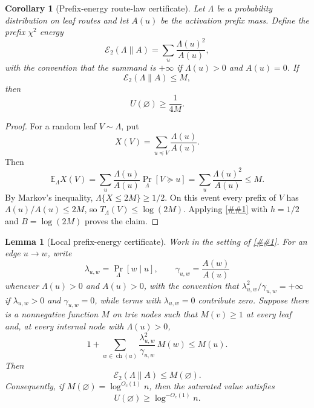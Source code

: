 \documentclass[10pt]{article}
\newcommand{\cref}[1]{\ref{##1}}
\newtheorem{lemma}[theorem]{Lemma}
\newtheorem{corollary}[theorem]{Corollary}
\theoremstyle{definition}
\newcommand{\E}{\mathbb{E}}
\begin{document}
\begin{corollary}[Prefix-energy route-law certificate]\label{cor:route-law-prefix-energy}
   Let $\Lambda$ be a probability distribution on leaf routes and let $A(u)$
   be the activation prefix mass. Define the prefix $\chi^2$ energy
   \[
      \mathcal E_2(\Lambda\|A)
      =
      \sum_{u}
      \frac{\Lambda(u)^2}{A(u)},
   \]
   with the convention that the summand is $+\infty$ if $\Lambda(u)>0$ and
   $A(u)=0$. If
   \[
      \mathcal E_2(\Lambda\|A)\le M,
   \]
   then
   \[
      U(\varnothing)\ge \frac{1}{4M}.
   \]
\end{corollary}

\begin{proof}
   For a random leaf $V\sim\Lambda$, put
   \[
      X(V)=\sum_{u\preceq V}\frac{\Lambda(u)}{A(u)}.
   \]
   Then
   \[
      \E_\Lambda X(V)
      =
      \sum_u
      \frac{\Lambda(u)}{A(u)}
      \Pr_\Lambda[V\succeq u]
      =
      \sum_u\frac{\Lambda(u)^2}{A(u)}
      \le M.
   \]
   By Markov's inequality, $\Lambda\{X\le2M\}\ge1/2$. On this event every
   prefix of $V$ has $\Lambda(u)/A(u)\le2M$, so
   $T_\Lambda(V)\le\log(2M)$. Applying
   \cref{cor:typical-route-law-toll} with $h=1/2$ and
   $B=\log(2M)$ proves the claim.
\end{proof}

\begin{lemma}[Local prefix-energy certificate]\label{lem:local-prefix-energy}
   Work in the setting of \cref{cor:route-law-prefix-energy}. For an edge
   $u\to w$, write
   \[
      \lambda_{u,w}=\Pr_\Lambda[w\mid u],
      \qquad
      \gamma_{u,w}=\frac{A(w)}{A(u)}
   \]
   whenever $\Lambda(u)>0$ and $A(u)>0$, with the convention that
   $\lambda_{u,w}^2/\gamma_{u,w}=+\infty$ if
   $\lambda_{u,w}>0$ and $\gamma_{u,w}=0$, while terms with
   $\lambda_{u,w}=0$ contribute zero. Suppose there is a nonnegative function
   $M$ on trie nodes such that $M(v)\ge1$ at every leaf and, at every internal
   node with $\Lambda(u)>0$,
   \[
      1+
      \sum_{w\in\operatorname{ch}(u)}
      \frac{\lambda_{u,w}^2}{\gamma_{u,w}}\,M(w)
      \le M(u).
   \]
   Then
   \[
      \mathcal E_2(\Lambda\|A)\le M(\varnothing).
   \]
   Consequently, if $M(\varnothing)=\log^{O_c(1)}n$, then the saturated value
   satisfies
   \[
      U(\varnothing)\ge\log^{-O_c(1)}n .
   \]
\end{lemma}
\end{document}
